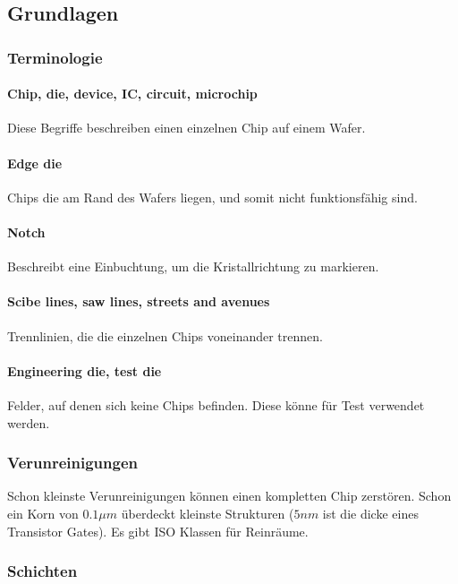 \subsection{Grundlagen}
	\subsubsection{Terminologie}
	
	\paragraph{Chip, die, device, IC, circuit, microchip} Diese Begriffe beschreiben einen einzelnen Chip auf einem Wafer.
	
	\paragraph{Edge die} Chips die am Rand des Wafers liegen, und somit nicht funktionsfähig sind. 
	
	\paragraph{Notch} Beschreibt eine Einbuchtung, um die Kristallrichtung zu markieren. 
	
	\paragraph{Scibe lines, saw lines, streets and avenues} Trennlinien, die die einzelnen Chips voneinander trennen.
	
	\paragraph{Engineering die, test die} Felder, auf denen sich keine Chips befinden. Diese könne für Test verwendet werden.
	
	\subsubsection{Verunreinigungen}
	
	Schon kleinste Verunreinigungen können einen kompletten Chip zerstören. Schon ein Korn von $0.1{\mu}m$ überdeckt kleinste Strukturen ($5nm$ ist die dicke eines Transistor Gates).
	Es gibt ISO Klassen für Reinräume.
	
	\subsubsection{Schichten}
	
